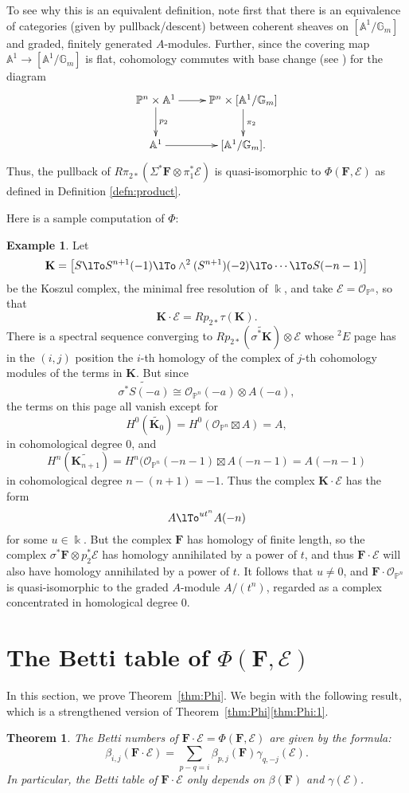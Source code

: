 \documentclass[12pt]{amsart}
\newtheorem{theorem}[lemma]{Theorem}
\theoremstyle{definition}
\newtheorem{example}[lemma]{Example}
\theoremstyle{remark}
\newcommand{\kk}{\Bbbk}
\newcommand{\PP}{\mathbb{P}}
\renewcommand{\AA}{\mathbb{A}}
\newcommand{\GG}{\mathbb{G}}
\newcommand{\cO}{\mathcal{O}}
\newcommand{\cE}{\mathcal{E}}
\newcommand{\bK}{\mathbf{K}}
\newcommand{\FF}{\mathbf{F}}
\begin{document}
To see why this is an equivalent definition, note first  that there is an equivalence of categories (given by pullback/descent) between coherent sheaves on $[\AA^1/\GG_m]$ and graded, finitely generated $A$-modules. Further, since the covering map $\AA^1\to [\AA^1/\GG_m]$ is flat, cohomology commutes with base change (see \cite[0765]{stacks-project}) for the diagram
\[
\xymatrix{
\PP^n\times \AA^1\ar[r]\ar[d]^-{p_2}&\PP^{n}\times [\AA^1/\GG_m]\ar[d]^{\pi_2}\\
\AA^1\ar[r]&[\AA^1/\GG_m].
}
\]
Thus, the pullback of $R\pi_{2*}\left( \Sigma^*\FF\otimes \pi_{1}^{*}\cE\right)$ is quasi-isomorphic 
to $\Phi(\FF,\cE)$ as defined in Definition \ref{defn:product}.

Here is a sample computation of $\Phi$: 

\begin{example} Let 
$$
\bK = \bigl[ S\lTo S^{n+1}(-1) \lTo \wedge^{2}(S^{n+1})(-2) \lTo\cdots\lTo S(-n-1)\bigr]
$$
be the Koszul complex, the minimal free resolution of $\kk$, and take
$\cE = \cO_{\PP^{n}}$, so that 
$$
\bK \cdot \cE = Rp_{2*}\tau(\bK).$$  
There is a spectral sequence converging to $Rp_{2*}(\widetilde {\sigma^{*}\bK})\otimes \cE$
whose $^{2}E$ page has in the $(i,j)$ position the $i$-th homology of the complex
of $j$-th cohomology modules of the terms in $\bK$. But since
$$
\widetilde {\sigma^{*} S(-a)} \cong \cO_{\PP^{n}}(-a)\otimes A(-a),
$$
the terms on this page all vanish except for
$$
H^{0} (\widetilde{\bK_{0}}) = H^{0}(\cO_{\PP^{n}}\boxtimes A) = A,
$$
in cohomological degree 0, and 
$$
H^{n}(\widetilde{\bK_{n+1}}) = H^{n}(\cO_{\PP^{n}}(-n-1)\boxtimes A(-n-1) = A(-n-1)
$$
in cohomological degree $n-(n+1) = -1$.
Thus the complex $\bK \cdot \cE$ has the form
$$
A\lTo^{ut^{n}}A(-n)
$$
for some $u\in \kk$. But the complex $\FF$ has homology of finite length, so the complex $\sigma^{*}\FF \otimes p_{2}^{*}\cE$ has homology annihilated by a power of $t$, and thus $\FF\cdot \cE$ will also have homology annihilated by a power of $t$. It follows that $u\neq 0$, and $\FF\cdot \cO_{\PP^{n}}$ is quasi-isomorphic to the graded $A$-module $A/(t^{n})$, regarded as a complex concentrated in homological degree 0.
\end{example}


\section{The Betti table of $\Phi(\FF,\cE)$}\label{sec:duality pairing}
In this section, we prove Theorem~\ref{thm:Phi}.  We begin with the following result, which is a strengthened version of Theorem~\ref{thm:Phi}\eqref{thm:Phi:1}.
\begin{theorem}\label{thm:betti numbers of pairing}
The Betti numbers of $\FF\cdot \cE = \Phi(\FF,\cE)$ are given by the formula:
\[
\beta_{i,j}(\FF\cdot \cE)=\sum_{p-q=i}  \beta_{p,j}(\FF)\gamma_{q,-j}(\cE).
\]
In particular, the Betti table of $\FF\cdot \cE$ only depends on $\beta(\FF)$ and $\gamma(\cE)$.
\end{theorem}
\end{document}
